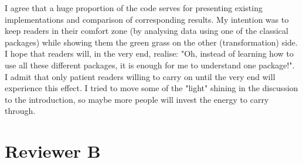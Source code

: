 \documentclass[12pt]{article}
\begin{document}
\begin{enumerate}
I agree that a huge proportion of the code serves for presenting existing
implementations and comparison of corresponding results. My intention was to
keep readers in their comfort zone (by analysing data using one of the
classical packages) while showing them the green grass on the other
(transformation) side. I hope that readers will, in the very end, realise:
"Oh, instead of learning how to use all these different packages, it is
enough for me to understand one package!". I admit that only patient readers
willing to carry on until the very end will experience this effect. I tried
to move some of the "light" shining in the discussion to the introduction,
so maybe more people will invest the energy to carry through.

\end{enumerate}

\section*{Reviewer B}
\end{document}
